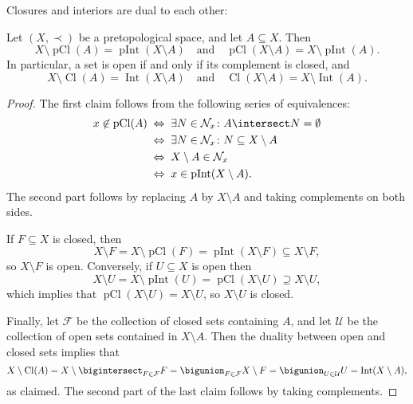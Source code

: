 \documentclass[article, a4paper, 11pt, oneside]{memoir}
\numberwithin{equation}{chapter}
\newcommand{\calU}{\mathcal{U}}
\newcommand{\calF}{\mathcal{F}}
\newcommand{\inpoint}{\prec}
\newcommand{\calN}{\mathcal{N}}
\newcommand{\nhoods}[1]{\calN_{#1}}
\newcommand{\pInt}[1]{\operatorname{pInt}(#1)}
\newcommand{\pCl}[1]{\operatorname{pCl}(#1)}
\renewcommand{\interior}[1]{\operatorname{Int}(#1)}
\renewcommand{\closure}[1]{\operatorname{Cl}(#1)}
\renewcommand{\iff}{\Leftrightarrow}
\begin{document}
Closures and interiors are dual to each other:
%
\begin{proposition}
    Let $(X,\inpoint)$ be a pretopological space, and let $A \subseteq X$. Then
    \begin{equation*}
        X \setminus \pCl{A} = \pInt{X \setminus A}
        \quad \text{and} \quad
        \pCl{X \setminus A} = X \setminus \pInt{A}.
    \end{equation*}
    In particular, a set is open if and only if its complement is closed, and
    \begin{equation*}
        X \setminus \closure{A} = \interior{X \setminus A}
        \quad \text{and} \quad
        \closure{X \setminus A} = X \setminus \interior{A}.
    \end{equation*}
\end{proposition}

\begin{proof}
    The first claim follows from the following series of equivalences:
    \begin{align*}
        x \not\in \pCl{A}
            &\;\iff\; \exists N \in \nhoods{x} \colon A \intersect N = \emptyset \\
            &\;\iff\; \exists N \in \nhoods{x} \colon N \subseteq X \setminus A \\
            &\;\iff\; X \setminus A \in \nhoods{x} \\
            &\;\iff\; x \in \pInt{X \setminus A}.
    \end{align*}
    The second part follows by replacing $A$ by $X \setminus A$ and taking complements on both sides.
    
    If $F \subseteq X$ is closed, then
    \begin{equation*}
        X \setminus F
            = X \setminus \pCl{F}
            = \pInt{X \setminus F}
            \subseteq X \setminus F,
    \end{equation*}
    so $X \setminus F$ is open. Conversely, if $U \subseteq X$ is open then
    \begin{equation*}
        X \setminus U
            = X \setminus \pInt{U}
            = \pCl{X \setminus U}
            \supseteq X \setminus U,
    \end{equation*}
    which implies that $\pCl{X \setminus U} = X \setminus U$, so $X \setminus U$ is closed.
    
    Finally, let $\calF$ be the collection of closed sets containing $A$, and let $\calU$ be the collection of open sets contained in $X \setminus A$. Then the duality between open and closed sets implies that
    \begin{equation*}
        X \setminus \closure{A}
            = X \setminus \bigintersect_{F \in \calF} F
            = \bigunion_{F \in \calF} X \setminus F
            = \bigunion_{U \in \calU} U
            = \interior{X \setminus A},
    \end{equation*}
    as claimed. The second part of the last claim follows by taking complements.
\end{proof}
\end{document}
